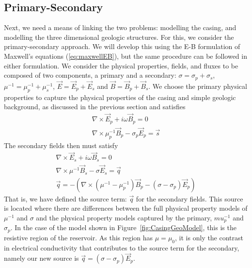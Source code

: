 \documentclass{segabs}
\newcommand{\curl}{\ensuremath{\nabla \times}}
\begin{document}
\subsection{Primary-Secondary}
Next, we need a means of linking the two problems: modelling the casing, and modelling the three dimensional geologic structures. For this, we consider the primary-secondary approach. We will develop this using the E-B formulation of Maxwell's equations (\ref{eq:maxwellEB}), but the same procedure can be followed in either formulation. We consider the physical properties, fields, and fluxes to be composed of two components, a primary and a secondary: $\sigma = \sigma_p + \sigma_s$, $\mu^{-1} = \mu_p^{-1} + \mu_s^{-1}$, $\vec{E} = \vec{E}_p + \vec{E}_s$ and $\vec{B} = \vec{B}_p + \vec{B}_s$. We choose the primary physical properties to capture the physical properties of the casing and simple geologic background, as discussed in the previous section and satisfies
\begin{equation}
\begin{split}
	\curl \vec{E}_p + i \omega \vec{B}_p = 0 \\
	\curl \mu^{-1}_p \vec{B}_p - \sigma_p \vec{E}_p = \vec{s}
\end{split}
\label{eq:primary}
\end{equation}
The secondary fields then must satisfy
\begin{equation}
\begin{split}
	\curl \vec{E}_s + i \omega \vec{B}_s = 0 \\
	\curl \mu^{-1}\vec{B}_s - \sigma \vec{E}_s = \vec{q} \\
	\vec{q} =  - (\curl (\mu^{-1} - \mu_p^{-1} ) \vec{B}_p - (\sigma - \sigma_p) \vec{E}_p)
\end{split}
\label{eq:secondary}
\end{equation}
That is, we have defined the source term: $\vec{q}$ for the secondary fields. This source is located where there are differences between the full physical property models of $\mu^{-1}$ and $\sigma$ and the physical property models captured by the primary, $mu^{-1}_p$ and $\sigma_p$. In the case of the model shown in Figure~\ref{fig:CasingGeoModel}, this is the resistive region of the reservoir.  As this region has $\mu = \mu_0$, it is only the contrast in electrical conductivity that contributes to the source term for the secondary, namely our new source is $\vec{q} = (\sigma - \sigma_p) \vec{E}_p$. 
\end{document}
